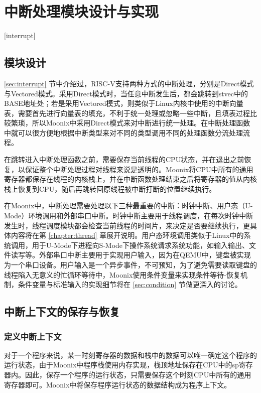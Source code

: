 
\chapter{中断处理模块设计与实现}[interrupt]
\label{chapter:interrupt}

\section{模块设计}

\ref{sec:interrupt} 节中介绍过，RISC-V支持两种方式的中断处理，分别是Direct模式与Vectored模式。采用Direct模式时，当任意中断发生后，都会跳转到stvec中的BASE地址处；若是采用Vectored模式，则类似于Linux内核中使用的中断向量表，需要首先进行向量表的填充，不利于统一处理或忽略一些中断，且填表过程比较繁琐，所以Moonix中采用Direct模式来对中断进行统一处理。在中断处理函数中就可以很方便地根据中断类型来对不同的类型调用不同的处理函数分流处理流程。

在跳转进入中断处理函数之前，需要保存当前线程的CPU状态，并在退出之前恢复，以保证整个中断处理过程对线程来说是透明的。Moonix将CPU中所有的通用寄存器都保存在线程的内核栈上，并在中断函数处理结束之后将寄存器的值从内核栈上恢复到CPU，随后再跳转回原线程被中断打断的位置继续执行。

在Moonix中，中断处理需要处理以下三种最重要的中断：时钟中断、用户态（U-Mode）环境调用和外部串口中断。时钟中断主要用于线程调度，在每次时钟中断发生时，线程调度模块都会检查当前线程的时间片，来决定是否要继续执行，更具体内容将在第 \ref{chapter:thread} 章展开说明。用户态环境调用类似于Linux中的系统调用，用于U-Mode下进程向S-Mode下操作系统请求系统功能，如输入输出、文件读写等。外部串口中断主要用于实现用户输入，因为在QEMU中，键盘被实现为一个串口设备。用户输入是一个异步事件，不可预知，为了避免需要读取键盘的线程陷入无意义的忙循环等待中，Moonix使用条件变量来实现条件等待-恢复机制，条件变量与标准输入的实现细节将在 \ref{sec:condition} 节做更深入的讨论。

\section{中断上下文的保存与恢复}

\subsection{定义中断上下文}

对于一个程序来说，某一时刻寄存器的数据和栈中的数据可以唯一确定这个程序的运行状态，由于Moonix中程序栈使用内存实现，栈顶地址保存在CPU中的sp寄存器内。因此，保存一个程序的运行状态，只需要保存这个时刻CPU中所有的通用寄存器即可。Moonix中将保存程序运行状态的数据结构成为程序上下文。


